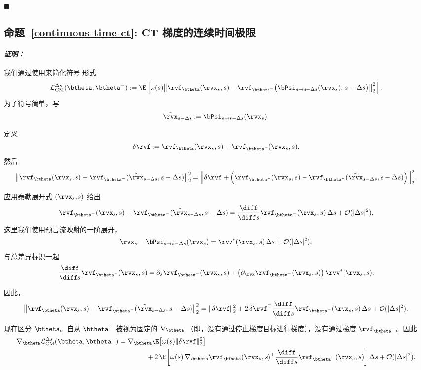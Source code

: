 \hfill$\blacksquare$


\subsection{命题~\ref{continuous-time-ct}: CT 梯度的连续时间极限}

\paragraph{\textit{证明：}}

我们通过使用来简化符号  形式
\begin{align*}
\mathcal{L}_{\mathrm{CM}}^{\Delta s}(\btheta,\btheta^-)
:=
\E \left[\omega(s)\big\|
\rvf_{\btheta}(\rvx_s,s) -
\rvf_{\btheta^-}\big(\bPsi_{s\to s-\Delta s}(\rvx_s),\, s-\Delta s\big)
\big\|_2^2\right].
\end{align*}
为了符号简单，写
\[
\tilde\rvx_{s-\Delta s}:=\bPsi_{s\to s-\Delta s}(\rvx_s).
\]

定义
\[
\delta \rvf
:= \rvf_{\btheta}(\rvx_s,s)-\rvf_{\btheta^-}(\rvx_s,s).
\]
然后
\begin{align*}
\big\|\rvf_{\btheta}(\rvx_s, s)- \rvf_{\btheta^-}(\tilde\rvx_{s-\Delta s}, s-\Delta s)\big\|_2^2
=
\Big\|\delta \rvf
+
\Big(\rvf_{\btheta^-}(\rvx_s, s)-\rvf_{\btheta^-}(\tilde\rvx_{s-\Delta s}, s-\Delta s)\Big)\Big\|_2^2.
\end{align*}

应用泰勒展开式 $(\rvx_s,s)$ 给出
\begin{align*}
\rvf_{\btheta^-}(\rvx_s,s) -
\rvf_{\btheta^-}(\tilde\rvx_{s-\Delta s}, s-\Delta s)
=
\frac{\diff}{\diff s}\rvf_{\btheta^-}(\rvx_s,s)\,\Delta s
+ \mathcal{O}(|\Delta s|^2),
\end{align*}
这里我们使用预言流映射的一阶展开，
\[
\rvx_s - \bPsi_{s\to s-\Delta s}(\rvx_s)
= \rvv^*(\rvx_s,s)\,\Delta s + \mathcal{O}(|\Delta s|^2),
\]
与总差异标识一起
\[
\frac{\diff}{\diff s}\rvf_{\btheta^-}(\rvx_s,s)
=
\partial_s \rvf_{\btheta^-}(\rvx_s,s)
+
\big(\partial_{\rvx}\rvf_{\btheta^-}(\rvx_s,s)\big)\,\rvv^*(\rvx_s,s).
\]

因此，
\begin{align*}
\big\|\rvf_{\btheta}(\rvx_s, s)- \rvf_{\btheta^-}(\tilde\rvx_{s-\Delta s}, s-\Delta s)\big\|_2^2
=
\|\delta \rvf\|_2^2
+
2\,\delta \rvf^\top \frac{\diff}{\diff s}\rvf_{\btheta^-}(\rvx_s,s)\,\Delta s
+
\mathcal{O}(|\Delta s|^2).
\end{align*}

现在区分 $\btheta$。自从 $\btheta^-$ 被视为固定的 $\nabla_{\btheta}$ （即，没有通过停止梯度目标进行梯度），没有通过梯度 $\rvf_{\btheta^-}$。因此
\begin{align*}
\nabla_{\btheta}\mathcal{L}_{\mathrm{CM}}^{\Delta s}(\btheta,\btheta^-)
&=
\nabla_{\btheta}\E\!\left[\omega(s)\|\delta \rvf\|_2^2\right]\\
&\qquad\qquad
+
2\,\E\!\left[
\omega(s)\,
\nabla_{\btheta}\rvf_{\btheta}(\rvx_s,s)^\top
\frac{\diff}{\diff s}\rvf_{\btheta^-}(\rvx_s,s)
\right]\Delta s
+
\mathcal{O}(|\Delta s|^2).
\end{align*}

